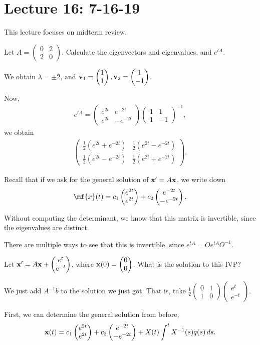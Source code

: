 \documentclass{article}
\newcommand{\mat}[1]{\begin{pmatrix}#1\end{pmatrix}}
\begin{document}
\section{Lecture 16: 7-16-19}

This lecture focuses on midterm review.

Let $A = \mat{0 & 2 \\ 2 & 0}$.  Calculate the eigenvectors and eigenvalues, and $e^{tA}$.

We obtain $\lambda = \pm 2$, and $\mbf{v}_1 = \mat{1 \\ 1}, \mbf{v}_2 = \mat{1 \\ -1}$.

Now,
\begin{align*}
  e^{tA} = \mat{e^{2t} & e^{-2t} \\ e^{2t} & - e^{-2t}} \mat{1 & 1 \\ 1 & -1}^{-1},
\end{align*}
we obtain
\begin{align*}
  \mat{\frac{1}{2} \left( e^{2t} + e^{-2t} \right) & \frac{1}{2} (e^{2t} - e^{-2t}) \\ \frac{1}{2} ( e^{2t} - e^{-2t}) & \frac{1}{2} ( e^{2t} + e^{-2t})}.
\end{align*}

Recall that if we ask for the general solution of $\mathbf{x}' = A \mathbf{x}$, we write down
\begin{align*}
  \mf{x}(t) = c_1 \mat{e^{2t} \\ e^{2t}} + c_2 \mat{e^{-2t} \\ - e^{-2t}}.
\end{align*}

Without computing the determinant, we know that this matrix is invertible, since the eigenvalues are distinct.

There are multiple ways to see that this is invertible, since $e^{tA} = O e^{tA} O^{-1}$.

Let $\mbf{x}' = A \mbf{x} + \mat{e^t \\ e^{-t}}$, where $\mbf{x}(0) = \mat{0 \\ 0}$.  What is the solution to this IVP?

We just add $A^{-1} b$ to the solution we just got.  That is, take $\frac{1}{2} \mat{0 & 1 \\ 1 & 0} \mat{e^t \\ e^{-t}}$.

First, we can determine the general solution from before,
\begin{align*}
  \mbf{x}(t) = c_1 \mat{e^{2t} \\ e^{2t}} + c_2 \mat{e^{-2t} \\ - e^{-2t}} + X(t) \int^{t} X^{-1} (s) q(s) \, ds.
\end{align*}
\end{document}
